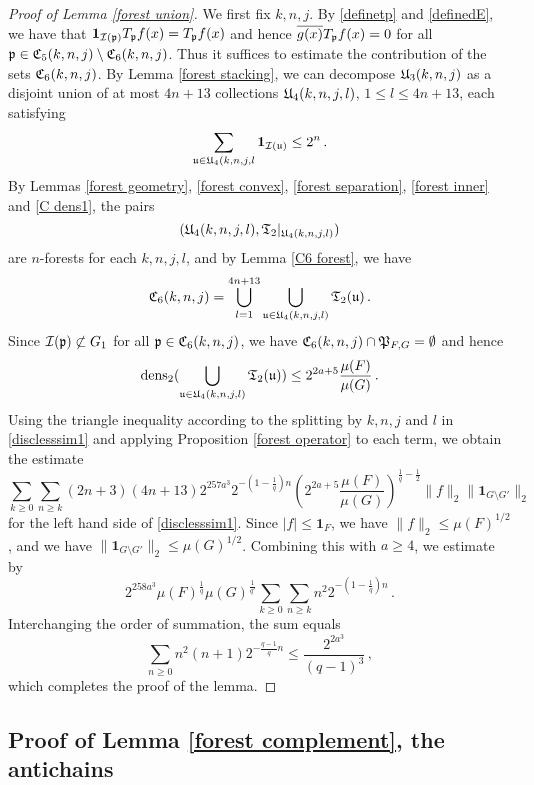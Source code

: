 {\begin{proof}[Proof of Lemma \ref{forest union}]
    We first fix $k,n, j$.
    By \eqref{definetp} and \eqref{definedE}, we have that
    $\mathbf{1}_{\mathcal{I}(\mathfrak p)} T_{\mathfrak p}f(x) = T_{\mathfrak p}f(x)$ and hence $\overline{g(x)} T_{\mathfrak p}f(x)= 0$ for all $\mathfrak p \in \mathfrak C_5(k,n,j) \setminus \mathfrak C_6(k,n,j)$.
    Thus it suffices to estimate the contribution of the sets $\mathfrak C_6(k,n,j)$. By Lemma \ref{forest stacking}, we can decompose $\mathfrak U_3(k,n,j)$ as a disjoint union of at most $4n + 13$ collections $\mathfrak U_4(k,n,j,l)$, $1 \le l \le 4n+13$, each satisfying
    $$
        \sum_{\mathfrak u \in \mathfrak U_4(k,n,j,l} \mathbf{1}_{\mathcal{I}(\mathfrak u)} \le 2^n\,.
    $$
    By Lemmas \ref{forest geometry}, \ref{forest convex}, \ref{forest separation}, \ref{forest inner} and \ref{C dens1}, the pairs
    $$
        (\mathfrak U_4(k,n,j,l), \mathfrak{T}_2|_{\mathfrak U_4(k,n,j,l)})
    $$
    are $n$-forests for each $k,n,j,l$, and by Lemma \ref{C6 forest}, we have
    $$
        \mathfrak C_6(k,n,j) = \bigcup_{l = 1}^{4n + 13} \bigcup_{\mathfrak u \in \mathfrak U_4(k,n,j,l)} \mathfrak{T}_2(\mathfrak u)\,.
    $$
    Since $\mathcal{I}(\mathfrak p) \not\subset G_1$ for all $\mathfrak p \in \mathfrak C_6(k,n,j)$, we have $\mathfrak C_6(k,n,j) \cap \mathfrak P_{F,G} = \emptyset$ and hence
    $$
        \operatorname{\operatorname{dens}}_2(\bigcup_{\mathfrak u \in \mathfrak U_4(k,n,j,l)} \mathfrak{T}_2(\mathfrak u)) \le 2^{2a + 5} \frac{\mu(F)}{\mu(G)}\,.
    $$
    Using the triangle inequality according to the splitting by $k,n,j$ and $l$ in \eqref{disclesssim1} and applying Proposition \ref{forest operator} to each term, we obtain the estimate
    $$
        \sum_{k \ge 0}\sum_{n \ge k} (2n+3)(4n+13) 2^{257a^3}2^{-(1-\frac{1}{q})n}(2^{2a+5} \frac{\mu(F)}{\mu(G)})^{\frac{1}{q} - \frac{1}{2}} \|f\|_2 \|\mathbf{1}_{G\setminus G'}\|_2
    $$
    for the left hand side of \eqref{disclesssim1}. Since $|f| \le \mathbf{1}_F$, we have $\|f\|_2 \le \mu(F)^{1/2}$, and we have $\|\mathbf{1}_{G\setminus G'}\|_2 \le \mu(G)^{1/2}$. Combining this with $a \ge 4$, we estimate by
    $$
        2^{258a^3} \mu(F)^{\frac{1}{q}} \mu(G)^{\frac{1}{q'}} \sum_{k \ge 0}\sum_{n \ge k}n^2 2^{-(1-\frac{1}{q})n}\,.
    $$
    Interchanging the order of summation, the sum equals
    $$
        \sum_{n \ge 0} n^2(n+1) 2^{-\frac{q-1}{q}n} \le \frac{2^{2a^3}}{(q-1)^3}\,,
    $$
    which completes the proof of the lemma.
\end{proof}

\subsection{Proof of Lemma \ref{forest complement}, the antichains}
\label{subsecantichain}

}
